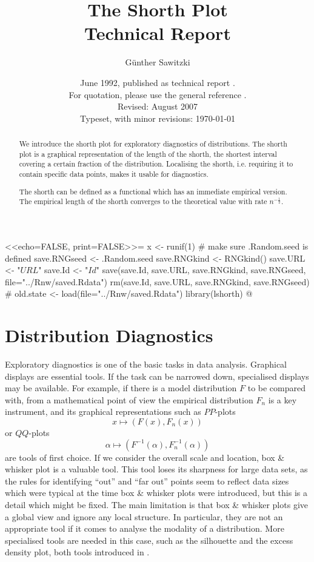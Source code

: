 \documentclass[dvips,12pt,a4paper,twoside]{amsart}
\title[The Shorth Plot]{The Shorth Plot\\\tiny{Technical Report}}
\author{G\"unther Sawitzki}
\date{June 1992, published as technical report \cite{gs92shrth}.\\
For quotation, please use the general reference \cite{gs94oned}.\\
Revised: August 2007\\
Typeset, with minor revisions: \today}                                           %
\begin{document}
<<echo=FALSE, print=FALSE>>=
x <- runif(1) # make sure  .Random.seed is defined
save.RNGseed <- .Random.seed
save.RNGkind <- RNGkind()
save.URL <- "$URL$"
save.Id <- "$Id$"
save(save.Id, save.URL, save.RNGkind, save.RNGseed, file="../Rnw/saved.Rdata")
rm(save.Id, save.URL, save.RNGkind, save.RNGseed)
# old.state <- load(file="../Rnw/saved.Rdata")
library(lshorth)
@
\begin{abstract}
We introduce the shorth plot for exploratory diagnostics of distributions. The shorth plot is a graphical representation of the length of the shorth, the shortest interval covering a certain fraction of the distribution. Localising the shorth, i.e. requiring it to contain specific data points, makes it usable for diagnostics.

The shorth can be defined as a functional which has an immediate empirical version. The empirical length of the shorth converges to the theoretical value with rate $n^{-\frac{1}{2}}$.
\end{abstract}

\maketitle
\begingroup
\setlength{\parskip}{0pt}
\tableofcontents
\endgroup
\section{Distribution Diagnostics}
Exploratory diagnostics is one of the basic tasks in data analysis. Graphical displays are essential tools. If the task can be narrowed down, specialised displays may be available. For example, if there is a model distribution $F$ to be compared with, from a mathematical point of view the empirical distribution $F_n$ is a key instrument, and its graphical representations such as 
$PP$-plots $$x \mapsto \left(F \left(x\right),F_n \left(x \right) \right)$$ 
or $QQ$-plots $$\alpha \mapsto \left(F^{-1} \left(\alpha\right),F_n^{-1} \left(\alpha \right) \right)$$ are tools of first choice. If we consider  the overall scale and location, box \& whisker plot is a valuable tool. This tool loses its sharpness for large data sets, as the rules for identifying ``out'' and ``far out'' points seem to reflect data sizes which were typical at the time box \& whisker plots were introduced, but this is a detail which might be fixed. The main limitation is that  box \& whisker plots give a global view and ignore any local structure. In particular, they are not an appropriate tool if it comes to analyse the modality of a distribution. More specialised tools are needed in this case, such as the silhouette and the excess density plot, both tools introduced in \cite{dwmgs91jasa}.
\end{document}
